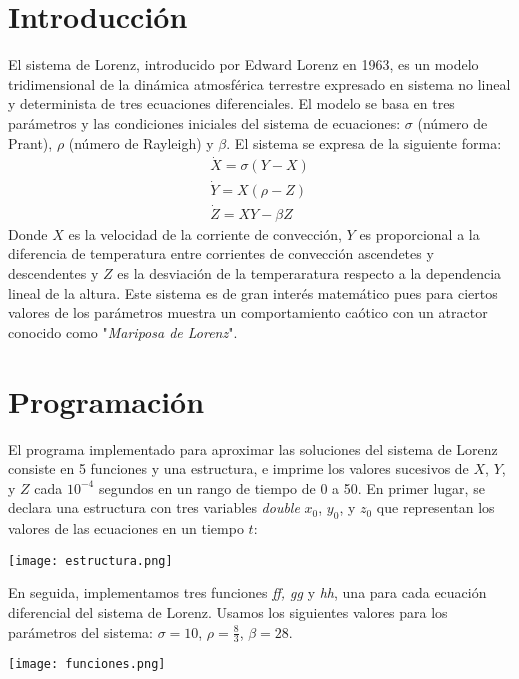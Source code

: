 \documentclass[letterpaper, 12pt]{article}
\begin{document}
{\section*{Introducci\'on}

\justify
El sistema de Lorenz, introducido por Edward Lorenz en 1963, es un modelo tridimensional de la dinámica atmosférica terrestre expresado en sistema no lineal y determinista de tres ecuaciones diferenciales. El modelo se basa en tres parámetros y las condiciones iniciales del sistema de ecuaciones: $\sigma$ (número de Prant), $\rho$ (número de Rayleigh) y $\beta$.
El sistema se expresa de la siguiente forma:
\begin{align}
\dot{X} = \sigma (Y-X)\\
\dot{Y} = X(\rho - Z)\\
\dot{Z} = XY - \beta Z
\end{align}
Donde $X$ es la velocidad de la corriente de convección, $Y$ es proporcional a la diferencia de temperatura entre  corrientes de convección ascendetes y descendentes y $Z$ es la desviación de la temperaratura respecto a la dependencia lineal de la altura. Este sistema es de gran interés matemático pues para ciertos valores de los parámetros muestra un comportamiento caótico con un atractor conocido como "\textit{Mariposa de Lorenz}". 


\section*{Programaci\'on}

\justify
El programa implementado para aproximar las soluciones del sistema de Lorenz consiste en 5 funciones y una estructura, e imprime los valores sucesivos de $X$, $Y$, y $Z$ cada $10^{-4}$ segundos en un rango de tiempo de 0 a 50. En primer lugar, se declara una estructura con tres variables \textit{double} $x_0$, $y_0$, y $z_0$ que representan los valores de las ecuaciones en un tiempo $t$:\\
\begin{center}
\texttt{[image: estructura.png]}\\
\end{center}
 En seguida, implementamos tres funciones \textit{ff, gg} y \textit{hh}, una para cada ecuación diferencial del sistema de Lorenz. Usamos los siguientes valores para los parámetros del sistema: $\sigma = 10$, $\rho = \frac{8}{3}$, $\beta = 28$. 
\begin{center}
 \texttt{[image: funciones.png]}
\end{center}

}
\end{document}
